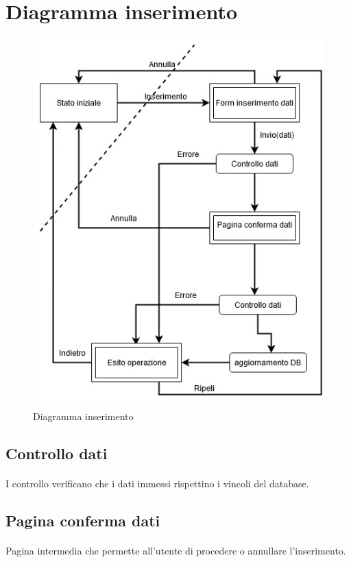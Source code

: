\documentclass[a4paper, 12pt]{report}
\begin{document}
        \section{Diagramma inserimento}
            \begin{figure}[httb]
                \centering
                \includegraphics[scale=0.8]{Immagini/diagrammaInserimento.jpg}
                \caption{Diagramma inserimento}
            \end{figure}
            \subsection{Controllo dati}
                \paragraph{}I controllo verificano che i dati immessi rispettino i vincoli del database.
            \subsection{Pagina conferma dati} 
                \paragraph{}Pagina intermedia che permette all'utente di procedere o annullare l'inserimento.
\end{document}
